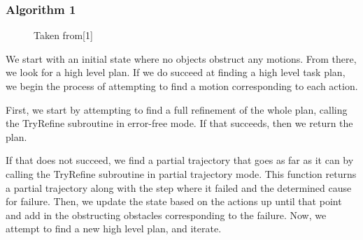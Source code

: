 \documentclass[12pt]{article}
\begin{document}
\subsubsection{Algorithm 1}

\begin{figure}[t]
	\centering
	\qquad
	\caption{Taken from[1]\label{fig:algorithms}}
\end{figure}

We start with an initial state where no objects obstruct any motions.  
From there, we look for a high level plan.  
If we do succeed at finding a high level task plan, we begin the process of attempting to find a motion corresponding to each action.

First, we start by attempting to find a full refinement of the whole plan, calling the TryRefine subroutine in error-free mode.  
If that succeeds, then we return the plan.  

If that does not succeed, we find a partial trajectory that goes as far as it can by calling the TryRefine subroutine in partial trajectory mode.  
This function returns a partial trajectory along with the step where it failed and the determined cause for failure.  
Then, we update the state based on the actions up until that point and add in the obstructing obstacles corresponding to the failure.  
Now, we attempt to find a new high level plan, and iterate.  
\end{document}
